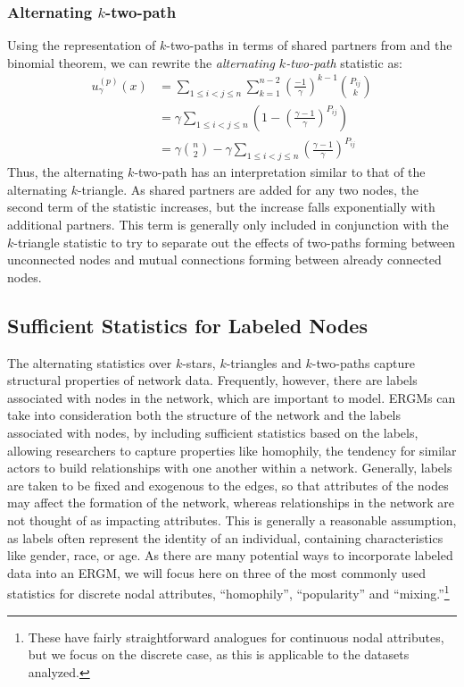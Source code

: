 \subsubsection{Alternating $k$-two-path}

Using the representation of $k$-two-paths in terms of shared partners from  and the binomial theorem, we can rewrite the \emph{alternating $k$-two-path} statistic as: 
\begin{align}
\label{eq:alternative-k-two-path}
u_\gamma^{(p)}(x) & = \sum_{1 \leq i < j \leq n} \sum_{k = 1}^{n-2} \left(\frac{-1}{\gamma}\right)^{k-1}  \binom{P_{ij}}{k} \nonumber\\
& = \gamma \sum_{1 \leq i < j \leq n}\left(1 - \left(\frac{\gamma-1}{\gamma} \right)^{P_{ij}} \right) \nonumber\\
& = \gamma \binom{n}{2} - \gamma \sum_{1 \leq i < j \leq n} \left(\frac{\gamma-1}{\gamma} \right)^{P_{ij}}
\end{align}
Thus, the alternating $k$-two-path has an interpretation similar to that of the alternating $k$-triangle. As shared partners are added for any two nodes, the second term of the statistic increases, but the increase falls exponentially with additional partners. This term is generally only included in conjunction with the $k$-triangle statistic to try to separate out the effects of two-paths forming between unconnected nodes and mutual connections forming between already connected nodes.

\subsection{Sufficient Statistics for Labeled Nodes}

The alternating statistics over $k$-stars, $k$-triangles and $k$-two-paths capture structural properties of network data. Frequently, however, there are labels associated with nodes in the network, which are important to model. ERGMs can take into consideration both the structure of the network and the labels associated with nodes, by including sufficient statistics based on the labels, allowing researchers to capture properties like homophily, the tendency for similar actors to build relationships with one another within a network. Generally, labels are taken to be fixed and exogenous to the edges, so that attributes of the nodes may affect the formation of the network, whereas relationships in the network are not thought of as impacting attributes. This is generally a reasonable assumption, as labels often represent the identity of an individual, containing characteristics like gender, race, or age. As there are many potential ways to incorporate labeled data into an ERGM, we will focus here on three of the most commonly used statistics for discrete nodal attributes, ``homophily'', ``popularity'' and ``mixing.''\footnote{These have fairly straightforward analogues for continuous nodal attributes, but we focus on the discrete case, as this is applicable to the datasets analyzed.} 

